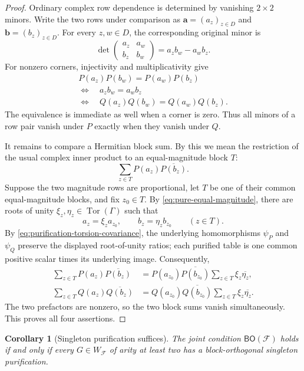 \documentclass[11pt]{article}
\theoremstyle{plain}
\newtheorem{corollary}[corollary]{Corollary}
\theoremstyle{definition}
\theoremstyle{remark}
\newcommand{\cF}{\mathcal F}
\newcommand{\BO}{\mathsf{BO}}
\DeclareMathOperator{\Tor}{Tor}
\begin{document}
\begin{proof}
Ordinary complex row dependence is determined by vanishing $2\times2$
minors.
Write the two rows under comparison as
$\mathbf a=(a_z)_{z\in D}$ and $\mathbf b=(b_z)_{z\in D}$.
For every $z,w\in D$, the corresponding original minor is
\[
  \det\begin{pmatrix}a_z&a_w\\ b_z&b_w\end{pmatrix}
  =a_zb_w-a_wb_z.
\]
For nonzero corners, injectivity and multiplicativity give
\[
  \begin{gathered}
  P(a_z)P(b_w)=P(a_w)P(b_z)\\
  \Longleftrightarrow\quad a_z b_w=a_w b_z\\
  \Longleftrightarrow\quad Q(a_z)Q(b_w)=Q(a_w)Q(b_z).
  \end{gathered}
\]
The equivalence is immediate as well when a corner is zero.  Thus all minors
of a row pair vanish under $P$ exactly when they vanish under $Q$.

It remains to compare a Hermitian block sum.  By this we mean the restriction
of the usual complex inner product to an equal-magnitude block $T$:
\[
  \sum_{z\in T}P(a_z)\overline{P(b_z)}.
\]
Suppose the two magnitude rows are proportional, let $T$ be one of their
common equal-magnitude blocks, and fix $z_0\in T$.  By
\eqref{eq:pure-equal-magnitude}, there are roots of unity
$\xi_z,\eta_z\in\Tor(\Gamma)$ such that
\[
  a_z=\xi_z a_{z_0},\qquad b_z=\eta_z b_{z_0}
  \qquad(z\in T).
\]
By \eqref{eq:purification-torsion-covariance}, the underlying homomorphisms
$\psi_P$ and $\psi_Q$ preserve the displayed root-of-unity ratios; each
purified table is one common positive scalar times its underlying image.
Consequently,
\begin{align*}
  \sum_{z\in T}P(a_z)\overline{P(b_z)}
  &=P(a_{z_0})\overline{P(b_{z_0})}
    \sum_{z\in T}\xi_z\overline{\eta_z},\\
  \sum_{z\in T}Q(a_z)\overline{Q(b_z)}
  &=Q(a_{z_0})\overline{Q(b_{z_0})}
    \sum_{z\in T}\xi_z\overline{\eta_z}.
\end{align*}
The two prefactors are nonzero, so the two block sums vanish simultaneously.
This proves all four assertions.
\end{proof}

\begin{corollary}[Singleton purification suffices]
\label{cor:singleton-purification}
The joint condition $\BO(\cF)$ holds if and only if every
$G\in W_{\cF}$ of arity at least two has a block-orthogonal singleton
purification.
\end{corollary}
\end{document}

